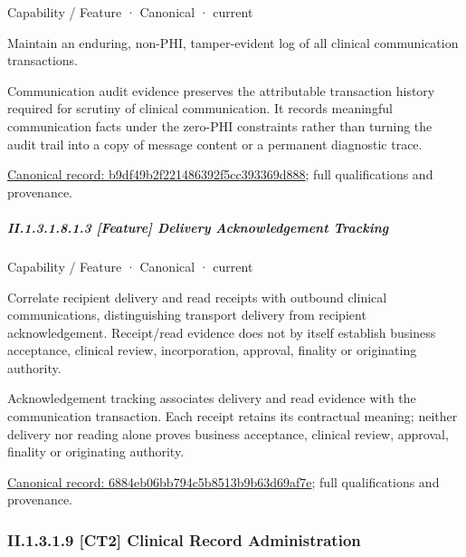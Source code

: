 \label{element:b9df49b2f221486392f5cc393369d888}
{\small Capability / Feature · Canonical · current}\par

Maintain an enduring, non-PHI, tamper-evident log of all clinical communication transactions.



Communication audit evidence preserves the attributable transaction history required for scrutiny of clinical communication. It records meaningful communication facts under the zero-PHI constraints rather than turning the audit trail into a copy of message content or a permanent diagnostic trace.


{\footnotesize \href{../../../../continuum/strategy/capability/feature/b9df49b2f221486392f5cc393369d888.md}{Canonical record: b9df49b2f221486392f5cc393369d888}; full qualifications and provenance.}\par
\subparagraph*{II.1.3.1.8.1.3 [Feature] Delivery Acknowledgement Tracking}
\label{navigation:II.1.3.1.8.1.3}

\label{element:6884eb06bb794c5b8513b9b63d69af7e}
{\small Capability / Feature · Canonical · current}\par

Correlate recipient delivery and read receipts with outbound clinical communications, distinguishing transport delivery from recipient acknowledgement. Receipt/read evidence does not by itself establish business acceptance, clinical review, incorporation, approval, finality or originating authority.



Acknowledgement tracking associates delivery and read evidence with the communication transaction. Each receipt retains its contractual meaning; neither delivery nor reading alone proves business acceptance, clinical review, approval, finality or originating authority.


{\footnotesize \href{../../../../continuum/strategy/capability/feature/6884eb06bb794c5b8513b9b63d69af7e.md}{Canonical record: 6884eb06bb794c5b8513b9b63d69af7e}; full qualifications and provenance.}\par
\subsubsection*{II.1.3.1.9 [CT2] Clinical Record Administration}
\label{navigation:II.1.3.1.9}

